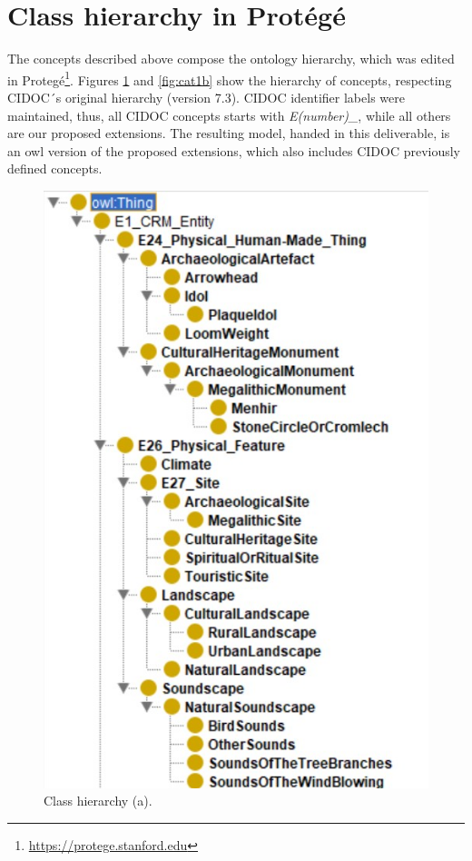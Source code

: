 \documentclass[10pt]{report}
\begin{document}
\section{Class hierarchy in Protégé}

The concepts described above compose the ontology hierarchy, which was edited in Protegé\footnote{\url{https://protege.stanford.edu}}. Figures \ref{fig:cat1a} and \ref{fig:cat1b} show the hierarchy of concepts, respecting CIDOC´s original hierarchy (version 7.3). CIDOC identifier labels were maintained,  thus, all CIDOC concepts starts with \textit{E(number)\_}, while all others are our proposed extensions. The resulting model, handed in this deliverable, is an owl version of the proposed extensions, which also includes CIDOC previously defined concepts. 

\begin{figure}[!ht]
\centering
\begin{minipage}{0.5\textwidth}
    \centering

    \includegraphics[height=0.5\textheight]{figures/OntoAlinhada_Atualizada.jpg}
    \caption{\label{fig:cat1a}Class hierarchy (a).}
    

\end{minipage}
\end{figure}
\end{document}

